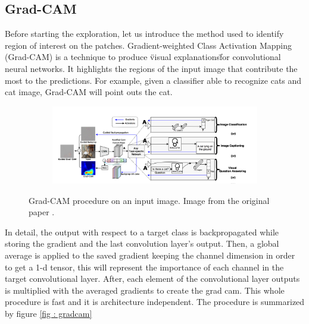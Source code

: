 \documentclass[../document.tex]{subfiles}
\begin{document}
\subsection{Grad-CAM}
Before starting the exploration, let us introduce the method used to identify region of interest on the patches. Gradient-weighted Class Activation Mapping (Grad-CAM) \cite{gradcam} is a technique to produce \"visual explanations\" for convolutional neural networks. It highlights the regions of the input image that contribute the most to the predictions. For example, given a classifier able to recognize cats and cat image, Grad-CAM will point outs the cat.
\begin{figure} [htbp]
    \centering
    \begin{subfigure}[b]{1\textwidth}
        \includegraphics[width=\linewidth]{../img/5/grad_cam1.png}
    \end{subfigure}
\caption{Grad-CAM procedure on an input image. Image from the original paper \cite{gradcam}.}
\label{fig: gradcam}
\end{figure}
In detail, the output with respect to a target class is backpropagated while storing the gradient and the last convolution layer's output. Then, a global average is applied to the saved gradient keeping the channel dimension in order to get a 1-d tensor, this will represent the importance of each channel in the target convolutional layer. After, each element of the convolutional layer outputs is multiplied with the averaged gradients to create the grad cam. This whole procedure is fast and it is architecture independent. The procedure is summarized by figure \ref{fig : gradcam}
\end{document}
